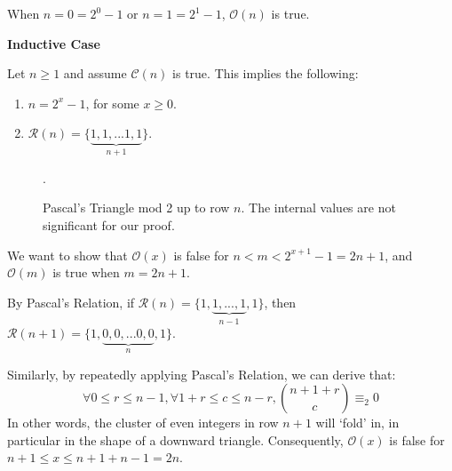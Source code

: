 \documentclass{article}
\newcommand{\pred}{\mathcal{O}}
\newcommand{\conject}{\mathcal{C}}
\newcommand{\modrow}{\mathcal{R}}
\newcommand{\drawemptyrow}[4]{
    \node at (#2/4, #3/4) {#4};
    \node at (#2/-4, #3/4) {#4};
  }
\newcommand{\drawrow}[4]{
  \drawemptyrow{#1}{#2}{#3}{#4}
  \foreach \i in {0,...,#1}{
    \node at (#2/-4-\i/-2,#3/4){#4};
  }
}
\newcommand{\drawoddtriangle}[2]{
  \foreach \i in {0,...,7}{
    \drawemptyrow{\i}{#1+0+\i}{#2+7-\i}{1}
   }
   \drawrow{7}{#1+7}{#2+21}{1}
  }
\begin{document}
When $n = 0 = 2^0-1$ or $n=1=2^1-1$, $\pred(n)$ is true.

\begin{center}\item\textbf{Inductive Case} \end{center}

Let $n\geq 1$ and assume $\conject(n)$ is true. This implies the following:
\begin{enumerate}
  \item $n = 2^x - 1$, for some $x \geq 0$.
  \item $\modrow(n) = \{\underbrace{1,1,...1,1}_{n+1}\}$.
\end{enumerate}

\begin{figure}[H]
\centering
{}
\caption {Pascal's Triangle mod 2 up to row $n$. The internal values are not significant for our proof.}.
\end{figure}

We want to show that $\pred(x)$ is false for $n < m < 2^{x+1}-1 = 2n+1$, and $\pred(m)$ is true when $m = 2n+1$.

By Pascal's Relation, if $\modrow(n) = \{1,\underbrace{1,...,1}_{n-1},1\}$, 
then $\modrow(n+1) = \{1,\underbrace{0,0,...0,0}_{n},1\}$.

\begin{figure}[H]
\centering
{}
\end{figure}

Similarly, by repeatedly applying Pascal's Relation, we can derive that:
$$
\forall 0 \leq r \leq n-1, \forall 1+r\leq c \leq n-r, {n+1+r \choose c} \equiv_2 0
$$
In other words, the cluster of even integers in row $n+1$ will `fold' in, in particular in the shape of a downward triangle. Consequently, $\pred(x)$ is false for $n+1\leq x \leq n+1+n-1 = 2n$.

\begin{figure}[H]
\centering
{}
\end{figure}
\end{document}
